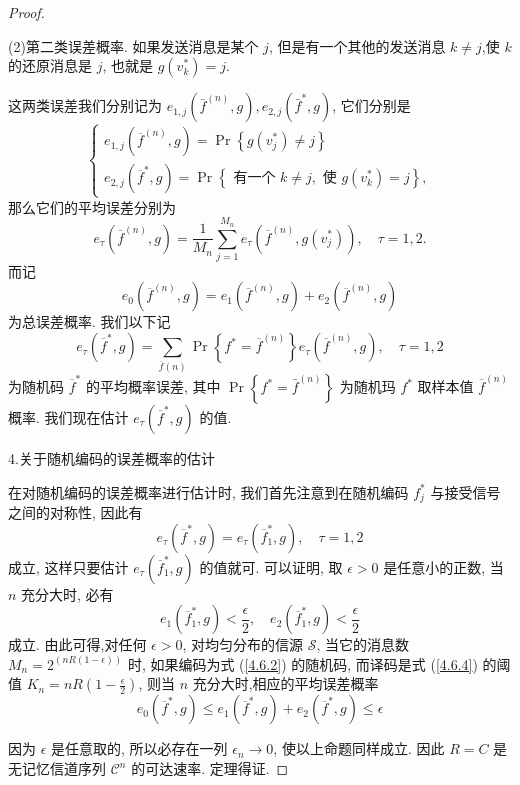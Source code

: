 \begin{proof}
\begin{definition}
(2)第二类误差概率. 如果发送消息是某个 $ j $, 但是有一个其他的发送消息 $ k \neq j $,使 $ k $ 的还原消息是 $ j $, 也就是 $ g\left(v_{k}^{*}\right)=j $.
\end{definition}
这两类误差我们分别记为 $ e_{1, j}\left(\bar{f}^{(n)}, g\right), e_{2, j}\left(\bar{f}^{*}, g\right) $, 它们分别是
$$
\left\{\begin{array}{l}
e_{1, j}\left(\overline{f}^{(n)}, g\right)=\operatorname{Pr}\left\{g\left(v_{j}^{*}\right) \neq j\right\} \\
e_{2, j}\left(\overline{f}^{*}, g\right)=\operatorname{Pr}\left\{\text { 有一个 } k \neq j, \text { 使 } g\left(v_{k}^{*}\right)=j\right\},
\end{array}\right.
$$
那么它们的平均误差分别为
$$
e_{\tau}\left(\overline{f}^{(n)}, g\right)=\frac{1}{M_{n}} \sum_{j=1}^{M_{n}} e_{\tau}\left(\overline{f}^{(n)}, g\left(v_{j}^{*}\right)\right), \quad \tau=1,2 .
$$
而记
$$
e_{0}\left(\overline{f}^{(n)}, g\right)=e_{1}\left(\overline{f}^{(n)}, g\right)+e_{2}\left(\overline{f}^{(n)}, g\right)
$$
为总误差概率. 我们以下记
$$
e_{\tau}\left(\overline{f}^{*}, g\right)=\sum_{\overline{f}(n)} \operatorname{Pr}\left\{f^{*}=\overline{f}^{(n)}\right\} e_{\tau}\left(\overline{f}^{(n)}, g\right), \quad \tau=1,2
$$
为随机码 $ \overline{f}^{*} $ 的平均概率误差, 其中 $ \operatorname{Pr}\left\{f^{*}=\bar{f}^{(n)}\right\} $ 为随机玛 $ f^{*} $ 取样本值 $ \overline{f}^{(n)} $ 概率. 我们现在估计 $ e_{\tau}\left(\overline{f}^{*}, g\right) $ 的值.

4.关于随机编码的误差概率的估计

在对随机编码的误差概率进行估计时, 我们首先注意到在随机编码 $ f_{j}^{*} $ 与接受信号之间的对称性, 因此有
$$
e_{\tau}\left(\overline{f}^{*}, g\right)=e_{\tau}\left(\overline{f}_{1}^{*}, g\right), \quad \tau=1,2
$$
成立, 这样只要估计 $ e_{\tau}\left(\overline{f}_{1}^{*}, g\right) $ 的值就可.
可以证明, 取 $ \epsilon>0 $ 是任意小的正数, 当 $ n $ 充分大时, 必有
$$
e_{1}\left(\overline{f}_{1}^{*}, g\right)<\frac{\epsilon}{2}, \quad e_{2}\left(\overline{f}_{1}^{*}, g\right)<\frac{\epsilon}{2}
$$
成立.
由此可得,对任何 $ \epsilon>0 $, 对均匀分布的信源 $ \mathscr{S} $, 当它的消息数 $ M_{n}=2^{(n R(1-\epsilon))} $ 时, 如果编码为式 (\ref{4.6.2}) 的随机码, 而译码是式 (\ref{4.6.4}) 的阈值 $ K_{n}=n R\left(1-\frac{\epsilon}{2}\right) $, 则当 $ n $ 充分大时,相应的平均误差概率
$$
e_{0}\left(\overline{f}^{*}, g\right) \leq e_{1}\left(\overline{f}^{*}, g\right)+e_{2}\left(\overline{f}^{*}, g\right) \leq \epsilon
$$

因为 $ \epsilon $ 是任意取的, 所以必存在一列 $ \epsilon_{n} \rightarrow 0 $, 使以上命题同样成立. 因此 $ R=C $ 是无记忆信道序列 $ \mathscr{C}^{n} $ 的可达速率. 定理得证.
\end{proof}



